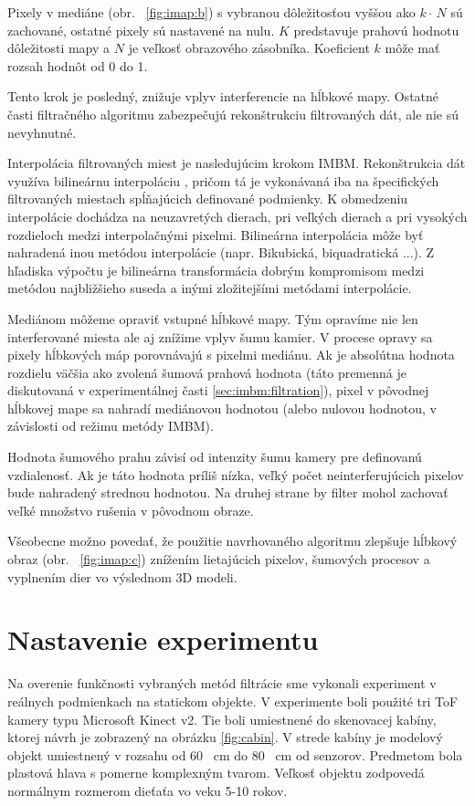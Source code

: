 Pixely v mediáne (obr. \, \ref{fig:imap:b}) s vybranou dôležitosťou vyššou ako $ k \cdot \, N $ sú zachované, ostatné pixely sú nastavené na nulu. $K$ predstavuje prahovú hodnotu dôležitosti mapy a $N$ je veľkosť obrazového zásobníka. Koeficient $k$ môže mať rozsah hodnôt od 0 do 1. 

Tento krok je posledný, znižuje vplyv interferencie na hĺbkové mapy. Ostatné časti filtračného algoritmu zabezpečujú rekonštrukciu filtrovaných dát, ale nie sú nevyhnutné. 

Interpolácia filtrovaných miest je nasledujúcim krokom IMBM. Rekonštrukcia dát využíva bilineárnu interpoláciu \cite{Volak2019}, pričom tá je vykonávaná iba na špecifických filtrovaných miestach spĺňajúcich definované podmienky. K obmedzeniu interpolácie dochádza na neuzavretých dierach, pri veľkých dierach a pri vysokých rozdieloch medzi interpolačnými pixelmi. Bilineárna interpolácia môže byť nahradená inou metódou interpolácie (napr. Bikubická, biquadratická ...). Z hľadiska výpočtu je bilineárna transformácia dobrým kompromisom medzi metódou najbližšieho suseda a inými zložitejšími metódami interpolácie.

Mediánom môžeme opraviť vstupné hĺbkové mapy. Tým opravíme nie len interferované miesta ale aj znížime vplyv šumu kamier. V procese opravy sa pixely hĺbkových máp porovnávajú s pixelmi mediánu. Ak je absolútna hodnota rozdielu väčšia ako zvolená šumová prahová hodnota (táto premenná je diskutovaná v experimentálnej časti \ref{sec:imbm:filtration}), pixel v pôvodnej hĺbkovej mape sa nahradí mediánovou hodnotou (alebo nulovou hodnotou, v závislosti od režimu metódy IMBM).

Hodnota šumového prahu závisí od intenzity šumu kamery pre definovanú vzdialenosť. Ak je táto hodnota príliš nízka, veľký počet neinterferujúcich pixelov bude nahradený strednou hodnotou. Na druhej strane by filter mohol zachovať veľké množstvo rušenia v pôvodnom obraze.

Všeobecne možno povedať, že použitie navrhovaného algoritmu zlepšuje hĺbkový obraz (obr. \, \ref{fig:imap:c}) znížením lietajúcich pixelov, šumových procesov a vyplnením dier vo výslednom 3D modeli.


\section{Nastavenie experimentu}

Na overenie funkčnosti vybraných metód filtrácie sme vykonali experiment v reálnych podmienkach na statickom objekte. V experimente boli použité tri ToF kamery typu Microsoft Kinect v2. Tie boli umiestnené do skenovacej kabíny, ktorej návrh je zobrazený na obrázku \ref{fig:cabin}. V strede kabíny je modelový objekt umiestnený v rozsahu od 60 \ cm do 80 \ cm od senzorov. Predmetom bola plastová hlava s pomerne komplexným tvarom. Veľkosť objektu zodpovedá normálnym rozmerom dieťaťa vo veku 5-10 rokov.

